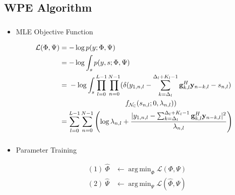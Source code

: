 \documentclass{beamer}
\DeclareMathOperator*{\argmin}{arg\,min}
\begin{document}
\subsection{WPE Algorithm}
\frame
{
  \frametitle{\subsecname}
  
  \begin{itemize}
  \item{MLE Objective Function}

   \begin{align*}
      \mathcal{L}(\Phi, \Psi) &= - \log p(y; \Phi, \Psi) \\
                                            &= - \log \int_s p(y, s; \Phi, \Psi) \\
                                            &= \begin{multlined}[t]
                                                      - \log \int_s \prod^{L-1}_{l=0}\prod^{N-1}_{n=0}(\delta(y_{1,n,l} - \sum_{k=\Delta_l}^{\Delta_l+K_l-1}\mathbf{g}^{H}_{k,l} \mathbf{y}_{n-k,l} - s_{n,l}) \\
                                                                                                                                 \shoveleft[70pt]{f_{\mathcal{N}_\mathbb{C}}(s_{n,l}; 0, \lambda_{n,l}))}
                                                  \end{multlined}\\ 
                                            & =  \sum^{L-1}_{l=0}\sum^{N-1}_{n=0}\left(\log \lambda_{n,l} + \frac{|y_{1,n,l} - \sum_{k=\Delta_l}^{\Delta_l+K_l-1}\mathbf{g}^{H}_{k,l} \mathbf{y}_{n-k,l}|^2}{\lambda_{n,l}}\right)
   \end{align*}

   \end{itemize}
}

\frame
{
  \frametitle{\subsecname}
  
  \begin{itemize}
  \item{Parameter Training}

   \begin{align*}
      (1)\  \hat{\Phi} & \leftarrow \argmin_{\Phi} \mathcal{L}(\Phi, \Psi) \\
      (2)\  \hat{\Psi} & \leftarrow \argmin_{\Psi} \mathcal{L}(\hat{\Phi}, \Psi) \\ 
   \end{align*}
   
   \end{itemize}
}
\end{document}
